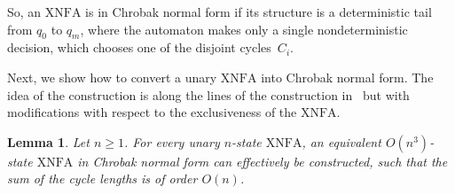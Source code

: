 \documentclass[final,copyright,noderivs]{eptcs}
\theoremstyle{plain}
\newtheorem{lemma}[theorem]{Lemma}
\theoremstyle{definition}
\newcommand{\xnfa}{\textrm{XNFA}}
\begin{document}
So, an $\xnfa$ is in Chrobak normal form if its structure is a deterministic
tail from $q_0$ to $q_m$, where the automaton makes only a single
nondeterministic decision, which chooses one of the disjoint cycles~$C_i$.

Next, we show how to convert a unary $\xnfa$ into Chrobak normal form. The idea of
the construction is along the lines of the construction
in~\cite{to:2009:ufaap} but with modifications with respect to the
exclusiveness of the $\xnfa$.
 

\begin{lemma}\label{lem:chrobak}
Let $n\geq 1$. For every unary $n$-state $\xnfa$, 
an equivalent $O(n^3)$-state $\xnfa$ in Chrobak normal form 
can effectively be constructed, such that the sum of the cycle 
lengths is of order $O(n)$.
\end{lemma}
\end{document}
